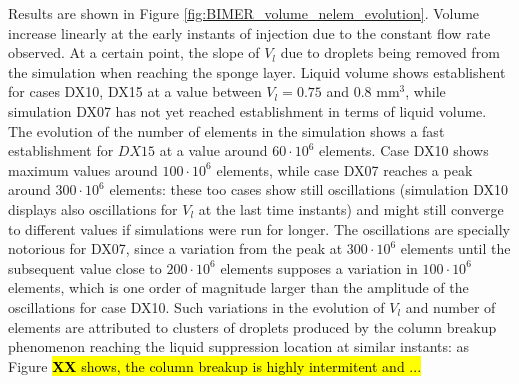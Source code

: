 Results are shown in Figure \ref{fig:BIMER_volume_nelem_evolution}. Volume increase linearly at the early instants of injection due to the constant flow rate observed. At a certain point, the slope of $V_l$ due to droplets being removed from the simulation when reaching the sponge layer. Liquid volume shows establishent for cases DX10, DX15 at a value between $V_l = 0.75$ and $0.8$ mm$^3$, while simulation DX07 has not yet reached establishment in terms of liquid volume. The evolution of the number of elements in the simulation shows a fast establishment for $DX15$ at a value around $60 \cdot 10^6$ elements. Case DX10 shows maximum values around $100 \cdot 10^6$ elements, while case DX07 reaches a peak around $300 \cdot 10^6$ elements: these too cases show still oscillations (simulation DX10 displays also oscillations for $V_l$ at the last time instants) and might still converge to different values if simulations were run for longer. The oscillations are specially notorious for DX07, since a variation from the peak at $300 \cdot 10^6$ elements until the subsequent value close to $200 \cdot 10^6$ elements supposes a variation in $100 \cdot 10^6$ elements, which is one order of magnitude larger than the amplitude of the oscillations for case DX10. Such variations in the evolution of $V_l$ and number of elements are attributed to  clusters of droplets produced by the column breakup phenomenon reaching the liquid suppression location at similar instants: as Figure \hl{\textbf{XX} shows, the column breakup is highly intermitent and ...}

